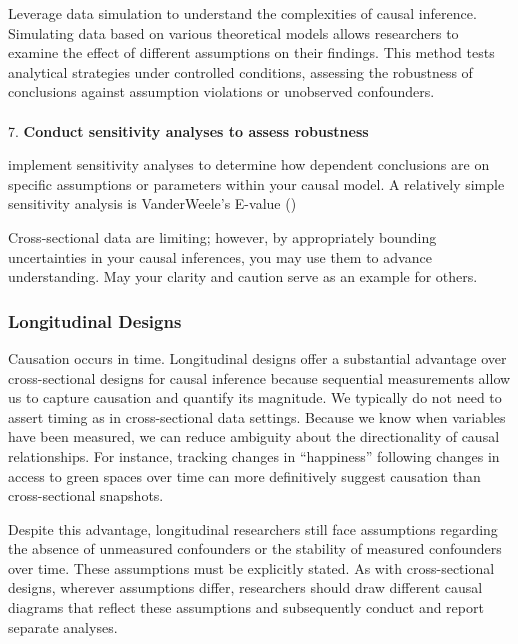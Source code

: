 \documentclass[
  singlecolumn]{article}
\makeatletter
\let\oldparagraph\paragraph
\renewcommand{\paragraph}{
    \@ifstar
      \xxxParagraphStar
      \xxxParagraphNoStar
  }
\newcommand{\xxxParagraphStar}[1]{\oldparagraph*{#1}\mbox{}}
\newcommand{\xxxParagraphNoStar}[1]{\oldparagraph{#1}\mbox{}}
\makeatother
\begin{document}
Leverage data simulation to understand the complexities of causal
inference. Simulating data based on various theoretical models allows
researchers to examine the effect of different assumptions on their
findings. This method tests analytical strategies under controlled
conditions, assessing the robustness of conclusions against assumption
violations or unobserved confounders.

\paragraph{\texorpdfstring{7. \textbf{Conduct sensitivity analyses to
assess
robustness}}{7. Conduct sensitivity analyses to assess robustness}}\label{conduct-sensitivity-analyses-to-assess-robustness}

implement sensitivity analyses to determine how dependent conclusions
are on specific assumptions or parameters within your causal model. A
relatively simple sensitivity analysis is VanderWeele's E-value
()

Cross-sectional data are limiting; however, by appropriately bounding
uncertainties in your causal inferences, you may use them to advance
understanding. May your clarity and caution serve as an example for
others.

\subsubsection{Longitudinal Designs}\label{longitudinal-designs}

Causation occurs in time. Longitudinal designs offer a substantial
advantage over cross-sectional designs for causal inference because
sequential measurements allow us to capture causation and quantify its
magnitude. We typically do not need to assert timing as in
cross-sectional data settings. Because we know when variables have been
measured, we can reduce ambiguity about the directionality of causal
relationships. For instance, tracking changes in ``happiness'' following
changes in access to green spaces over time can more definitively
suggest causation than cross-sectional snapshots.

Despite this advantage, longitudinal researchers still face assumptions
regarding the absence of unmeasured confounders or the stability of
measured confounders over time. These assumptions must be explicitly
stated. As with cross-sectional designs, wherever assumptions differ,
researchers should draw different causal diagrams that reflect these
assumptions and subsequently conduct and report separate analyses.
\end{document}
